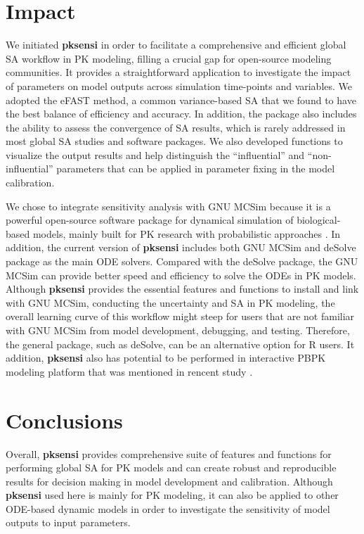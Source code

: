 \documentclass[preprint,12pt, a4paper]{elsarticle}
\begin{document}
\section{Impact}
\label{}

We initiated \textbf{pksensi} in order to facilitate a comprehensive
and efficient global SA workflow in PK modeling, filling a crucial gap
for open-source modeling communities. It provides a straightforward
application to investigate the impact of parameters on model outputs
across simulation time-points and variables. We adopted the eFAST
method, a common variance-based SA that we found to have the best
balance of efficiency and accuracy. In addition, the package also
includes the ability to assess the convergence of SA results, which is
rarely addressed in most global SA studies and software packages. We
also developed functions to visualize the output results and help
distinguish the ``influential'' and ``non-influential'' parameters that
can be applied in parameter fixing in the model calibration. 

We chose to integrate sensitivity analysis with GNU MCSim because it is
a powerful open-source software package for dynamical simulation of
biological-based models, mainly built for PK research with probabilistic
approaches \cite{bois2009gnu}. In addition, the current version of
\textbf{pksensi} includes both GNU MCSim and deSolve package as the
main ODE solvers. Compared with the deSolve package, the GNU
MCSim can provide better speed and efficiency to solve the ODEs in PK
models. Although \textbf{pksensi} provides the essential features and
functions to install and link with GNU MCSim, conducting the uncertainty
and SA in PK modeling, the overall learning curve of this workflow might
steep for users that are not familiar with GNU MCSim from model
development, debugging, and testing. Therefore, the general package,
such as deSolve, can be an alternative option for R users. It addition,
\textbf{pksensi} also has potential to be performed in interactive PBPK
modeling platform that was mentioned in rencent study \cite{li2019integration}.

\section{Conclusions}
\label{}

Overall, \textbf{pksensi} provides comprehensive suite of features and
functions for performing global SA for PK models and can create robust
and reproducible results for decision making in model development and
calibration. Although \textbf{pksensi} used here is mainly for PK
modeling, it can also be applied to other ODE-based dynamic models in
order to investigate the sensitivity of model outputs to input
parameters.
\end{document}
